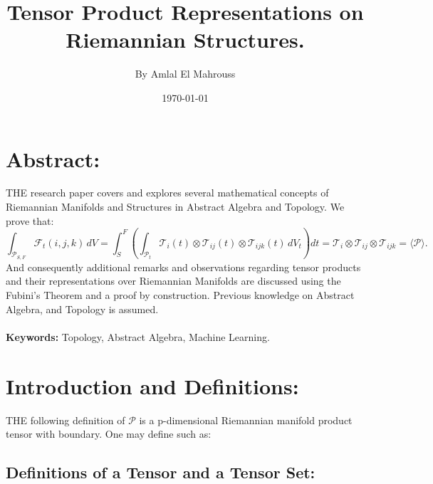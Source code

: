 \documentclass[10pt]{article}
\title{%
	\vspace{-1.5em}%
	\large\textbf{Tensor Product Representations on Riemannian Structures.}%
}
\author{By Amlal El Mahrouss}
\date{\today}
\theoremstyle{plain}
\theoremstyle{definition}
\theoremstyle{remark}
\begin{document}

\maketitle
\tableofcontents
\newpage

\section{Abstract:}

\lettrine[lines=1, lhang=0.1, loversize=0.2]{T}HE research paper covers and explores several mathematical concepts of Riemannian Manifolds and Structures in Abstract Algebra and Topology. We prove that:\\
\begin{equation}
  \int_{\mathcal{P}_{S,F}} \mathcal{F}_t(i,j,k)\,dV
  = \int_{S}^{F} \left(\int_{\mathcal{P}_t} \mathcal{T}_i(t) \otimes \mathcal{T}_{ij}(t) \otimes \mathcal{T}_{ijk}(t)\,dV_t\right) dt
  = \mathcal{T}_i \otimes \mathcal{T}_{ij} \otimes \mathcal{T}_{ijk}
  = \langle \mathcal{P} \rangle.
\end{equation}
And consequently additional remarks and observations regarding tensor products and their representations over Riemannian Manifolds are discussed using the Fubini's Theorem and a proof by construction. Previous knowledge on Abstract Algebra, and Topology is assumed.\\ \\
\textbf{Keywords: } Topology, Abstract Algebra, Machine Learning.

\section{Introduction and Definitions:}

\lettrine[lines=1, lhang=0.1, loversize=0.2]{T}HE following definition of $\mathcal{P}$ is a p-dimensional Riemannian manifold product tensor with boundary. One may define such as:

\subsection{Definitions of a Tensor and a Tensor Set:}
\end{document}
